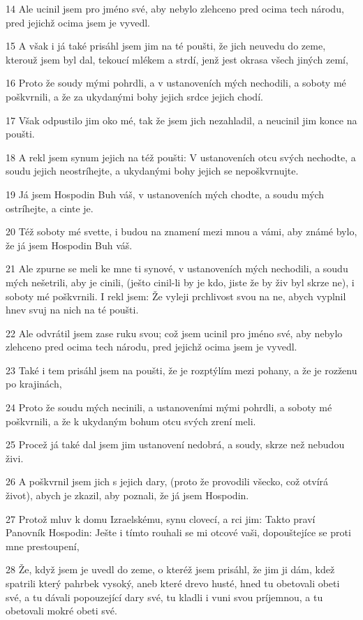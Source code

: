 \par 14 Ale ucinil jsem pro jméno své, aby nebylo zlehceno pred ocima tech národu, pred jejichž ocima jsem je vyvedl.
\par 15 A však i já také prisáhl jsem jim na té poušti, že jich neuvedu do zeme, kterouž jsem byl dal, tekoucí mlékem a strdí, jenž jest okrasa všech jiných zemí,
\par 16 Proto že soudy mými pohrdli, a v ustanoveních mých nechodili, a soboty mé poškvrnili, a že za ukydanými bohy jejich srdce jejich chodí.
\par 17 Však odpustilo jim oko mé, tak že jsem jich nezahladil, a neucinil jim konce na poušti.
\par 18 A rekl jsem synum jejich na též poušti: V ustanoveních otcu svých nechodte, a soudu jejich neostríhejte, a ukydanými bohy jejich se nepoškvrnujte.
\par 19 Já jsem Hospodin Buh váš, v ustanoveních mých chodte, a soudu mých ostríhejte, a cinte je.
\par 20 Též soboty mé svette, i budou na znamení mezi mnou a vámi, aby známé bylo, že já jsem Hospodin Buh váš.
\par 21 Ale zpurne se meli ke mne ti synové, v ustanoveních mých nechodili, a soudu mých nešetrili, aby je cinili, (ješto cinil-li by je kdo, jiste že by živ byl skrze ne), i soboty mé poškvrnili. I rekl jsem: Že vyleji prchlivost svou na ne, abych vyplnil hnev svuj na nich na té poušti.
\par 22 Ale odvrátil jsem zase ruku svou; což jsem ucinil pro jméno své, aby nebylo zlehceno pred ocima tech národu, pred jejichž ocima jsem je vyvedl.
\par 23 Také i tem prisáhl jsem na poušti, že je rozptýlím mezi pohany, a že je rozženu po krajinách,
\par 24 Proto že soudu mých necinili, a ustanoveními mými pohrdli, a soboty mé poškvrnili, a že k ukydaným bohum otcu svých zrení meli.
\par 25 Procež já také dal jsem jim ustanovení nedobrá, a soudy, skrze než nebudou živi.
\par 26 A poškvrnil jsem jich s jejich dary, (proto že provodili všecko, což otvírá život), abych je zkazil, aby poznali, že já jsem Hospodin.
\par 27 Protož mluv k domu Izraelskému, synu clovecí, a rci jim: Takto praví Panovník Hospodin: Ješte i tímto rouhali se mi otcové vaši, dopouštejíce se proti mne prestoupení,
\par 28 Že, když jsem je uvedl do zeme, o kteréž jsem prisáhl, že jim ji dám, kdež spatrili který pahrbek vysoký, aneb které drevo husté, hned tu obetovali obeti své, a tu dávali popouzející dary své, tu kladli i vuni svou príjemnou, a tu obetovali mokré obeti své.

